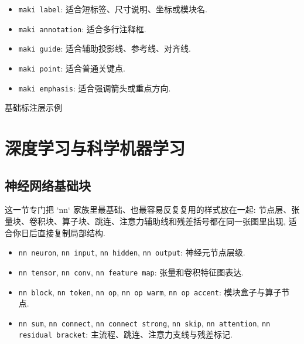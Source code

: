\documentclass[a4paper,12pt,oneside]{maki-notes}
\begin{document}
\begin{styleinventory}
\begin{itemize}
\item \texttt{maki label}: 适合短标签、尺寸说明、坐标或模块名.
\item \texttt{maki annotation}: 适合多行注释框.
\item \texttt{maki guide}: 适合辅助投影线、参考线、对齐线.
\item \texttt{maki point}: 适合普通关键点.
\item \texttt{maki emphasis}: 适合强调箭头或重点方向.
\end{itemize}
\end{styleinventory}

\begin{tikzstyleexample}{基础标注层示例}
\end{tikzstyleexample}

\chapter{深度学习与科学机器学习}

\section{神经网络基础块}

这一节专门把 `nn` 家族里最基础、也最容易反复复用的样式放在一起: 节点层、张量块、卷积块、算子块、跳连、注意力辅助线和残差括号都在同一张图里出现, 适合你日后直接复制局部结构.

\begin{styleinventory}
\begin{itemize}
\item \texttt{nn neuron}, \texttt{nn input}, \texttt{nn hidden}, \texttt{nn output}: 神经元节点层级.
\item \texttt{nn tensor}, \texttt{nn conv}, \texttt{nn feature map}: 张量和卷积特征图表达.
\item \texttt{nn block}, \texttt{nn token}, \texttt{nn op}, \texttt{nn op warm}, \texttt{nn op accent}: 模块盒子与算子节点.
\item \texttt{nn sum}, \texttt{nn connect}, \texttt{nn connect strong}, \texttt{nn skip}, \texttt{nn attention}, \texttt{nn residual bracket}: 主流程、跳连、注意力支线与残差标记.
\end{itemize}
\end{styleinventory}
\end{document}
